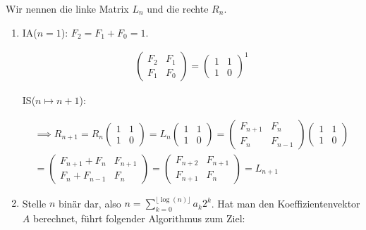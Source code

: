 \begin{solution}

Wir nennen die linke Matrix $L_n$ und die rechte $R_n$.

\begin{enumerate}[label = \alph*.]

  \item IA($n = 1$): $F_2 = F_1 + F_0 = 1$.

  \begin{align*}
  \begin{pmatrix}
    F_2 & F_1 \\
    F_1 & F_0
  \end{pmatrix}
  =
  \begin{pmatrix}
    1 & 1 \\
    1 & 0
  \end{pmatrix}^1
  \end{align*}

  IS($n \mapsto n + 1$):

  \begin{multline*}
    \implies
    R_{n+1}
    =
    R_n
    \begin{pmatrix}
      1 & 1 \\
      1 & 0
    \end{pmatrix}
    =
    L_n
    \begin{pmatrix}
      1 & 1 \\
      1 & 0
    \end{pmatrix}
    =
    \begin{pmatrix}
      F_{n+1} & F_n \\
      F_n     & F_{n-1}
    \end{pmatrix}
    \begin{pmatrix}
      1 & 1 \\
      1 & 0
    \end{pmatrix} \\
    =
    \begin{pmatrix}
      F_{n+1} + F_n & F_{n+1} \\
      F_n + F_{n-1} & F_n
    \end{pmatrix}
    =
    \begin{pmatrix}
      F_{n+2} & F_{n+1} \\
      F_{n+1} & F_n
    \end{pmatrix}
    =
    L_{n+1}
  \end{multline*}

  \item Stelle $n$ binär dar, also $n = \sum_{k= 0}^{\lfloor \log(n)\rfloor}a_k2^k$.
  Hat man den Koeffizientenvektor $A$ berechnet, führt folgender Algorithmus zum Ziel:


\end{enumerate}
\end{solution}
